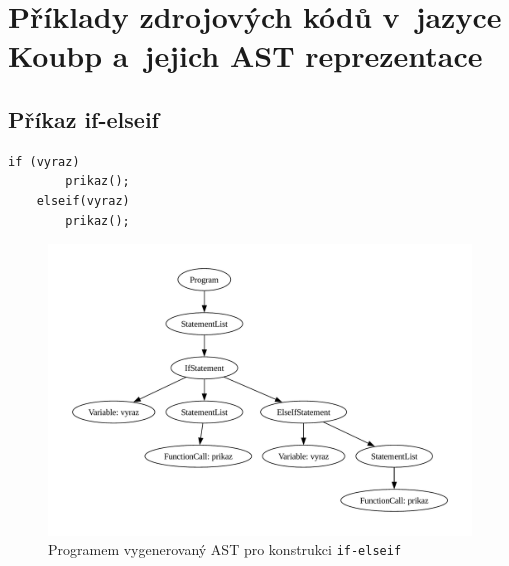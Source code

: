 
%


\chapter{Příklady zdrojových kódů v~jazyce Koubp a~jejich AST reprezentace}

\section{Příkaz if-elseif}
\begin{lstlisting}[language=Koubp]
    if (vyraz)
        prikaz();
    elseif(vyraz)
        prikaz();
\end{lstlisting}
\begin{figure}[ht]
    \centering
    \includegraphics[width=\textwidth]{obrazky-figures/ast_if_elseif.pdf}
    \caption{Programem vygenerovaný AST pro konstrukci \texttt{if-elseif}}
    \label{fig_ast_elseif}
\end{figure}

